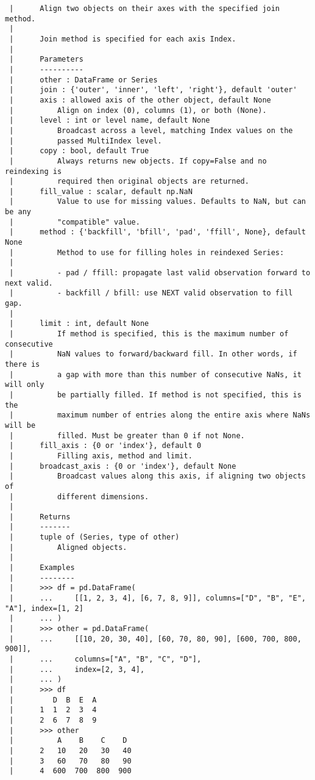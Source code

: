 \documentclass[
  letterpaper,
  DIV=11,
  numbers=noendperiod]{scrreprt}
\begin{document}
\begin{verbatim}
 |      Align two objects on their axes with the specified join method.
 |      
 |      Join method is specified for each axis Index.
 |      
 |      Parameters
 |      ----------
 |      other : DataFrame or Series
 |      join : {'outer', 'inner', 'left', 'right'}, default 'outer'
 |      axis : allowed axis of the other object, default None
 |          Align on index (0), columns (1), or both (None).
 |      level : int or level name, default None
 |          Broadcast across a level, matching Index values on the
 |          passed MultiIndex level.
 |      copy : bool, default True
 |          Always returns new objects. If copy=False and no reindexing is
 |          required then original objects are returned.
 |      fill_value : scalar, default np.NaN
 |          Value to use for missing values. Defaults to NaN, but can be any
 |          "compatible" value.
 |      method : {'backfill', 'bfill', 'pad', 'ffill', None}, default None
 |          Method to use for filling holes in reindexed Series:
 |      
 |          - pad / ffill: propagate last valid observation forward to next valid.
 |          - backfill / bfill: use NEXT valid observation to fill gap.
 |      
 |      limit : int, default None
 |          If method is specified, this is the maximum number of consecutive
 |          NaN values to forward/backward fill. In other words, if there is
 |          a gap with more than this number of consecutive NaNs, it will only
 |          be partially filled. If method is not specified, this is the
 |          maximum number of entries along the entire axis where NaNs will be
 |          filled. Must be greater than 0 if not None.
 |      fill_axis : {0 or 'index'}, default 0
 |          Filling axis, method and limit.
 |      broadcast_axis : {0 or 'index'}, default None
 |          Broadcast values along this axis, if aligning two objects of
 |          different dimensions.
 |      
 |      Returns
 |      -------
 |      tuple of (Series, type of other)
 |          Aligned objects.
 |      
 |      Examples
 |      --------
 |      >>> df = pd.DataFrame(
 |      ...     [[1, 2, 3, 4], [6, 7, 8, 9]], columns=["D", "B", "E", "A"], index=[1, 2]
 |      ... )
 |      >>> other = pd.DataFrame(
 |      ...     [[10, 20, 30, 40], [60, 70, 80, 90], [600, 700, 800, 900]],
 |      ...     columns=["A", "B", "C", "D"],
 |      ...     index=[2, 3, 4],
 |      ... )
 |      >>> df
 |         D  B  E  A
 |      1  1  2  3  4
 |      2  6  7  8  9
 |      >>> other
 |          A    B    C    D
 |      2   10   20   30   40
 |      3   60   70   80   90
 |      4  600  700  800  900

\end{verbatim}
\end{document}
